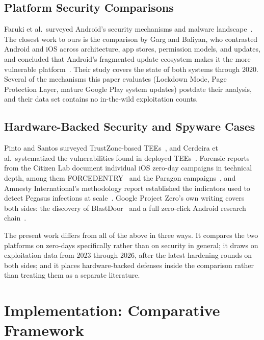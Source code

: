\documentclass[conference,a4paper]{IEEEtran}
\begin{document}
\subsection{Platform Security Comparisons}
Faruki et al.\ surveyed Android's security mechanisms and malware
landscape~\cite{faruki2015android}. The closest work to ours is the
comparison by Garg and Baliyan, who contrasted Android and iOS across
architecture, app stores, permission models, and updates, and concluded
that Android's fragmented update ecosystem makes it the more vulnerable
platform~\cite{garg2021comparative}. Their study covers the state of both
systems through 2020. Several of the mechanisms this paper evaluates
(Lockdown Mode, Page Protection Layer, mature Google Play system updates)
postdate their analysis, and their data set contains no in-the-wild
exploitation counts.

\subsection{Hardware-Backed Security and Spyware Cases}
Pinto and Santos surveyed TrustZone-based TEEs~\cite{pinto2019demystifying},
and Cerdeira et al.\ systematized the vulnerabilities found in deployed
TEEs~\cite{cerdeira2020sok}. Forensic reports from the Citizen Lab document
individual iOS zero-day campaigns in technical depth, among them
FORCEDENTRY~\cite{marczak2021forcedentry} and the Paragon
campaigns~\cite{marczak2025graphite}, and Amnesty International's
methodology report established the indicators used to detect Pegasus
infections at scale~\cite{amnesty2021forensic}. Google Project Zero's own writing
covers both sides: the discovery of BlastDoor~\cite{silvanovich2021imessage}
and a full zero-click Android research chain~\cite{silvanovich2026pixel}.

The present work differs from all of the above in three ways. It compares
the two platforms on zero-days specifically rather than on security in
general; it draws on exploitation data from 2023 through 2026, after the
latest hardening rounds on both sides; and it places hardware-backed
defenses inside the comparison rather than treating them as a separate
literature.

\section{Implementation: Comparative Framework}
\end{document}
